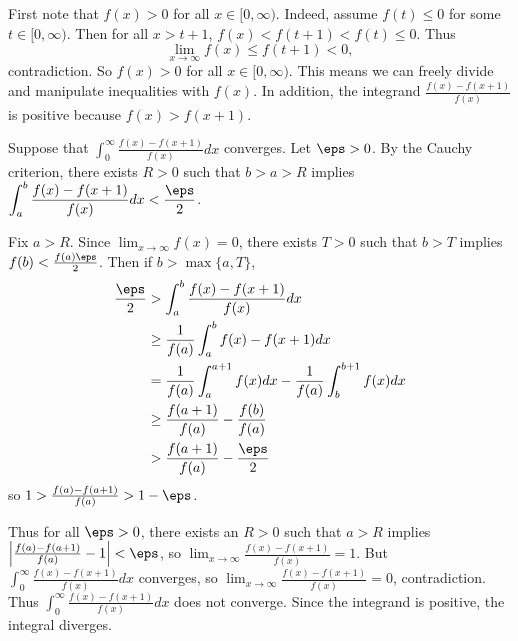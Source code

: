 First note that $f(x)>0$ for all $x\in[0,\infty)$. Indeed, assume $f(t)\leq0$ for some $t\in[0,\infty)$. Then for all $x>t+1$, $f(x)<f(t+1)<f(t)\leq0$. Thus \[\lim_{x\to\infty}f(x)\leq f(t+1)<0,\] contradiction. So $f(x)>0$ for all $x\in[0,\infty)$. This means we can freely divide and manipulate inequalities with $f(x)$. In addition, the integrand $\frac{f(x)-f(x+1)}{f(x)}$ is positive because $f(x)>f(x+1)$.

Suppose that $\displaystyle\int_0^{\infty}\frac{f(x)-f(x+1)}{f(x)}dx$ converges. Let $\eps>0$. By the Cauchy criterion, there exists $R>0$ such that $b>a>R$ implies $\displaystyle\int_a^b\frac{f(x)-f(x+1)}{f(x)}dx<\frac{\eps}{2}$.

Fix $a>R$. Since $\displaystyle\lim_{x\to\infty}f(x)=0$, there exists $T>0$ such that $b>T$ implies $f(b)<\frac{f(a)\eps}{2}$. Then if $b>\max\{a,T\}$,
\begin{align*}
	\frac{\eps}{2}&>\int_a^b\frac{f(x)-f(x+1)}{f(x)}dx\\
	&\geq\frac{1}{f(a)}\int_a^bf(x)-f(x+1)dx\\
	&=\frac{1}{f(a)}\int_a^{a+1}f(x)dx-\frac{1}{f(a)}\int_b^{b+1}f(x)dx\\
	&\geq\frac{f(a+1)}{f(a)}-\frac{f(b)}{f(a)}\\
	&>\frac{f(a+1)}{f(a)}-\frac{\eps}{2}
\end{align*}
so $1>\frac{f(a)-f(a+1)}{f(a)}>1-\eps$.

Thus for all $\eps>0$, there exists an $R>0$ such that $a>R$ implies $\left|\frac{f(a)-f(a+1)}{f(a)}-1\right|<\eps$, so $\displaystyle\lim_{x\to\infty}\frac{f(x)-f(x+1)}{f(x)}=1$. But $\displaystyle\int_0^{\infty}\frac{f(x)-f(x+1)}{f(x)}dx$ converges, so $\displaystyle\lim_{x\to\infty}\frac{f(x)-f(x+1)}{f(x)}=0$, contradiction. Thus $\displaystyle\int_0^{\infty}\frac{f(x)-f(x+1)}{f(x)}dx$ does not converge. Since the integrand is positive, the integral diverges.
